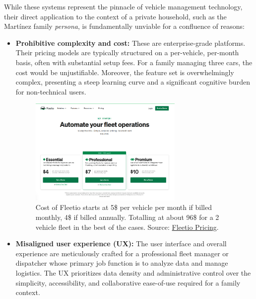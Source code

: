 \textgap

While these systems represent the pinnacle of vehicle management technology, their direct application to the context of a private household, such as the Martínez family \textit{persona}, is fundamentally unviable for a confluence of reasons:

\begin{itemize}
    \item \textbf{Prohibitive complexity and cost:} These are enterprise-grade platforms. Their pricing models are typically structured on a per-vehicle, per-month basis, often with substantial setup fees. For a family managing three cars, the cost would be unjustifiable. Moreover, the feature set is overwhelmingly complex, presenting a steep learning curve and a significant cognitive burden for non-technical users.

    \begin{figure}[H]
        \centering
        \includegraphics[width=0.7\textwidth]{images/background/fleetio-pricing.png}
        \caption{Cost of Fleetio starts at 5\$ per vehicle per month if billed monthly, 4\$ if billed annually. Totalling at about 96\$ for a 2 vehicle fleet in the best of the cases. Source: \href{https://www.fleetio.com/pricing}{Fleetio Pricing}.}
    \end{figure}
    
    \textgap
    
    \item \textbf{Misaligned user experience (UX):} The user interface and overall experience are meticulously crafted for a professional fleet manager or dispatcher whose primary job function is to analyze data and manage logistics. The UX prioritizes data density and administrative control over the simplicity, accessibility, and collaborative ease-of-use required for a family context.
    
    \textgap
    

\end{itemize}
